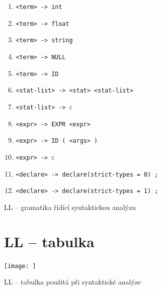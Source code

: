 \documentclass[a4paper, 12pt]{article}
\begin{document}
\begin{table}[!ht]
\begin{enumerate}[noitemsep]
			\item \verb|<term> -> int|
			\item \verb|<term> -> float|
			\item \verb|<term> -> string|
			\item \verb|<term> -> NULL|
			\item \verb|<term> -> ID|

			\item \verb|<stat-list> -> <stat> <stat-list>|
			\item \verb|<stat-list> -> |$\varepsilon$

			\item \verb|<expr> -> EXPR <expr>|
			\item \verb|<expr> -> ID ( <args> )|
			\item \verb|<expr> -> |$\varepsilon$

			\item \verb|<declare> -> declare(strict-types = 0) ;|
			\item \verb|<declare> -> declare(strict-types = 1) ;|

		\end{enumerate}

		\caption{LL -- gramatika řídící syntaktickou analýzu}
		\label{table:ll_gramatika}
	\end{table}

    \newpage
	\section{LL -- tabulka}
	\begin{table}[!ht]
		\centering
		\texttt{[image: ]}
		\caption{LL -- tabulka použitá při syntaktické analýze}
		\label{table:ll_table}
	\end{table}

    \newpage
\end{document}
